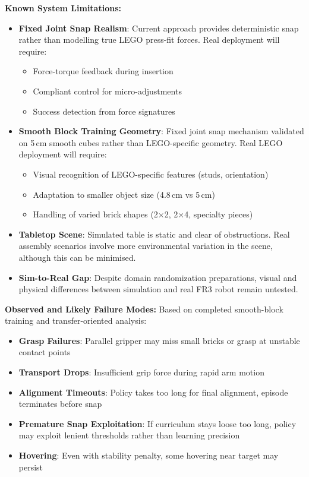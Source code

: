 \documentclass[12pt,a4paper,oneside]{report}
\begin{document}
\textbf{Known System Limitations:}
\begin{itemize}
    \item \textbf{Fixed Joint Snap Realism}: Current approach provides deterministic snap rather than modelling true LEGO press-fit forces. Real deployment will require:
    \begin{itemize}
        \item Force-torque feedback during insertion
        \item Compliant control for micro-adjustments
        \item Success detection from force signatures
    \end{itemize}

    \item \textbf{Smooth Block Training Geometry}: Fixed joint snap mechanism validated on 5\,cm smooth cubes rather than LEGO-specific geometry. Real LEGO deployment will require:
    \begin{itemize}
        \item Visual recognition of LEGO-specific features (studs, orientation)
        \item Adaptation to smaller object size (4.8\,cm vs 5\,cm)
        \item Handling of varied brick shapes (2$\times$2, 2$\times$4, specialty pieces)
    \end{itemize}

    \item \textbf{Tabletop Scene}: Simulated table is static and clear of obstructions. Real assembly scenarios involve more environmental variation in the scene, although this can be minimised.

    \item \textbf{Sim-to-Real Gap}: Despite domain randomization preparations, visual and physical differences between simulation and real FR3 robot remain untested.
\end{itemize}

\textbf{Observed and Likely Failure Modes:}
Based on completed smooth-block training and transfer-oriented analysis:
\begin{itemize}
    \item \textbf{Grasp Failures}: Parallel gripper may miss small bricks or grasp at unstable contact points
    \item \textbf{Transport Drops}: Insufficient grip force during rapid arm motion
    \item \textbf{Alignment Timeouts}: Policy takes too long for final alignment, episode terminates before snap
    \item \textbf{Premature Snap Exploitation}: If curriculum stays loose too long, policy may exploit lenient thresholds rather than learning precision
    \item \textbf{Hovering}: Even with stability penalty, some hovering near target may persist
\end{itemize}
\end{document}
